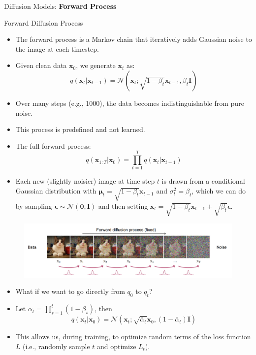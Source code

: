 \begin{frame}{}
    \LARGE Diffusion Models: \textbf{Forward Process}
\end{frame}

\begin{frame}[allowframebreaks]{Forward Diffusion Process}
    \begin{itemize}
        \item The forward process is a Markov chain that iteratively adds Gaussian noise to the image at each timestep.
        \item Given clean data $\mathbf{x}_0$, we generate $\mathbf{x}_t$ as:
        $$q(\mathbf{x}_t|\mathbf{x}_{t-1}) = \mathcal{N}(\mathbf{x}_t;\sqrt{1-\beta_t}\mathbf{x}_{t-1}, \beta_t\mathbf{I})$$
        \item Over many steps (e.g., 1000), the data becomes indistinguishable from pure noise.
    \framebreak
        \item This process is predefined and not learned.
        \item The full forward process:
        $$q(\mathbf{x}_{1:T}|\mathbf{x}_{0}) = \prod^{T}_{t=1}q(\mathbf{x}_t|\mathbf{x}_{t-1})$$
        \item Each new (slightly noisier) image at time step $t$ is drawn from a conditional Gaussian distribution with $\mathbf{\mu}_t = \sqrt{1 - \beta_t} \mathbf{x}_{t-1}$ and $\sigma^2_t = \beta_t$, which we can do by sampling $\mathbf{\epsilon} \sim \mathcal{N}(\mathbf{0}, \mathbf{I})$ and then setting $\mathbf{x}_t = \sqrt{1 - \beta_t} \mathbf{x}_{t-1} +  \sqrt{\beta_t} \mathbf{\epsilon}$.
    \end{itemize}
    \framebreak
    \begin{figure}
        \centering
        \includegraphics[height=0.7\textheight, width=\textwidth, keepaspectratio]{images/diffusion/diff_2.png}
    \end{figure}
    \begin{itemize}
        \item What if we want to go directly from $q_0$ to $q_t$?
        \item Let $\overline{\alpha}_t = \prod^t_{s=1}(1-\beta_s)$, then
        $$q(\mathbf{x}_t | \mathbf{x}_0) = \mathcal{N}(\mathbf{x}_t; \sqrt{\overline{\alpha}_t} \mathbf{x}_0 , (1 - \overline{\alpha}_t) \mathbf{I})$$
        \item This allows us, during training, to optimize random terms of the loss function $L$ (i.e., randomly sample $t$ and optimize $L_t$).
    \end{itemize}
\end{frame}

